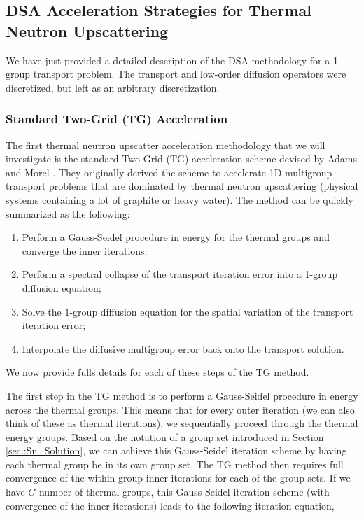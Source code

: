 \subsection{DSA Acceleration Strategies for Thermal Neutron Upscattering}
\label{sec::DSA_DSA_MG}

We have just provided a detailed description of the DSA methodology for a 1-group transport problem. The transport and low-order diffusion operators were discretized, but left as an arbitrary discretization. 

\subsubsection{Standard Two-Grid (TG) Acceleration}
\label{sec:DSA_DSA_MG_TG}

The first thermal neutron upscatter acceleration methodology that we will investigate is the standard Two-Grid (TG) acceleration scheme devised by Adams and Morel \cite{adams1993two}. They originally derived the scheme to accelerate 1D multigroup transport problems that are dominated by thermal neutron upscattering (physical systems containing a lot of graphite or heavy water). The method can be quickly summarized as the following:

\begin{enumerate}
\item Perform a Gauss-Seidel procedure in energy for the thermal groups and converge the inner iterations;
\item Perform a spectral collapse of the transport iteration error into a 1-group diffusion equation;
\item Solve the 1-group diffusion equation for the spatial variation of the transport iteration error;
\item Interpolate the diffusive multigroup error back onto the transport solution.
\end{enumerate}

\noindent We now provide fulls details for each of these steps of the TG method.

The first step in the TG method is to perform a Gauss-Seidel procedure in energy across the thermal groups. This means that for every outer iteration (we can also think of these as thermal iterations), we sequentially proceed through the thermal energy groups. Based on the notation of a group set introduced in Section \ref{sec::Sn_Solution}, we can achieve this Gauss-Seidel iteration scheme by having each thermal group be in its own group set. The TG method then requires full convergence of the within-group inner iterations for each of the group sets. If we have $G$ number of thermal groups, this Gauss-Seidel iteration scheme (with convergence of the inner iterations) leads to the following iteration equation,

